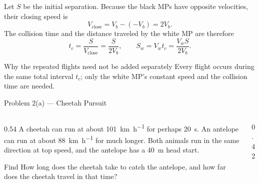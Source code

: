 \begin{solutionframe}
  \footnotesize
  Let $S$ be the initial separation. Because the black MPs have opposite
  velocities, their closing speed is
  \[
    V_{\mathrm{close}}=V_b-(-V_b)=2V_b.
  \]
  The collision time and the distance traveled by the white MP are therefore
  \[
    t_c=\frac{S}{V_{\mathrm{close}}}=\frac{S}{2V_b},
    \qquad
    S_w=V_wt_c=\frac{V_wS}{2V_b}.
  \]
  \begin{block}{Why the repeated flights need not be added separately}
    Every flight occurs during the same total interval $t_c$; only the white
    MP's constant speed and the collision time are needed.
  \end{block}
\end{solutionframe}

\begin{frame}{Problem 2(a) — Cheetah Pursuit}
  \vspace{0.35em}
  \begin{columns}[T,onlytextwidth]
    \begin{column}{0.54\textwidth}
      \small
      A cheetah can run at about
      \SI{101}{\kilo\metre\per\hour} for perhaps \SI{20}{\second}. An
      antelope can run at about \SI{88}{\kilo\metre\per\hour} for much
      longer. Both animals run in the same direction at top speed, and the
      antelope has a \SI{40}{\metre} head start.
      \vspace{0.55em}
      \begin{block}{Find}
        How long does the cheetah take to catch the antelope, and how far does
        the cheetah travel in that time?
      \end{block}
    \end{column}
    \begin{column}{0.42\textwidth}
      \centering
      \begingroup
        \def\cheetahparta{1}
        \resizebox{\textwidth}{!}{}
      \endgroup
    \end{column}
  \end{columns}
\end{frame}

